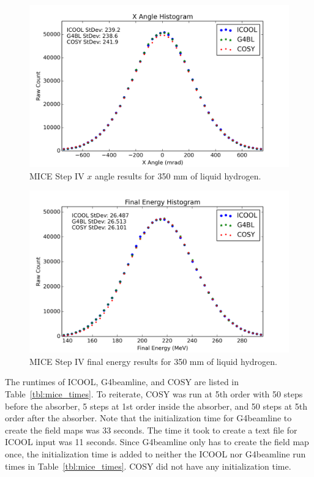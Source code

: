 \begin{figure}[H]
  \centering
    \includegraphics[width=\textwidth]{MICE data/px} 
  \caption{MICE Step IV $x$ angle results for 350 mm of liquid hydrogen.}
  \label{fig:micexangle}
\end{figure}

\begin{figure}[H]
  \centering
    \includegraphics[width=\textwidth]{MICE data/e} 
  \caption{MICE Step IV final energy results for 350 mm of liquid hydrogen.}
  \label{fig:miceenergy}
\end{figure}

The runtimes of ICOOL, G4beamline, and COSY are listed in Table~\ref{tbl:mice_times}. To reiterate, COSY was run at 5th order with 50 steps before the absorber, 5 steps at 1st order inside the absorber, and 50 steps at 5th order after the absorber. Note that the initialization time for G4beamline to create the field maps was 33 seconds. The time it took to create a text file for ICOOL input was 11 seconds. Since G4beamline only has to create the field map once, the initialization time is added to neither the ICOOL nor G4beamline run times in Table~\ref{tbl:mice_times}. COSY did not have any initialization time.

